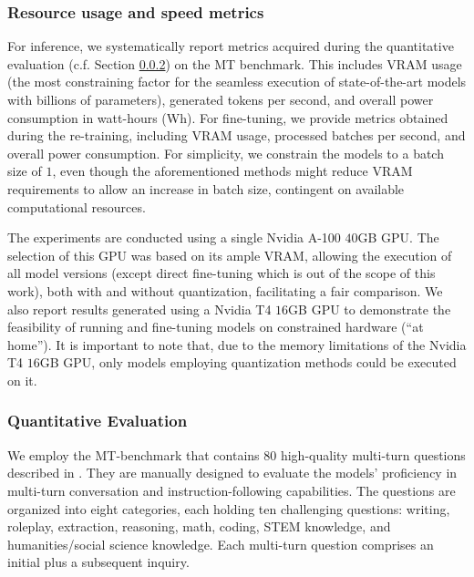 \documentclass[conference]{IEEEtran}
\begin{document}
\subsubsection{Resource usage and speed metrics}
For inference, we systematically report metrics acquired during the quantitative evaluation (c.f. Section \ref{sec:quantitative_evaluation}) on the MT benchmark. This includes VRAM usage (the most constraining factor for the seamless execution of state-of-the-art models with billions of parameters), generated tokens per second, and overall power consumption in watt-hours (Wh).
For fine-tuning, we provide metrics obtained during the re-training, including VRAM usage, processed batches per second, and overall power consumption. 
For simplicity, we constrain the models to a batch size of $1$, even though the aforementioned methods might reduce VRAM requirements to allow an increase in batch size, contingent on available computational resources.

The experiments are conducted using a single Nvidia A-100 $40$GB GPU. The selection of this GPU was based on its ample VRAM, allowing the execution of all model versions (except direct fine-tuning which is out of the scope of this work), both with and without quantization, facilitating a fair comparison. We also report results generated using a Nvidia T4 $16$GB GPU to demonstrate the feasibility of running and fine-tuning models on constrained hardware (``at home''). It is important to note that, due to the memory limitations of the Nvidia T4 $16$GB GPU, only models employing quantization methods could be executed on it.

\subsubsection{Quantitative Evaluation}\label{sec:quantitative_evaluation}
We employ the MT-benchmark that contains $80$ high-quality multi-turn questions described in \cite{zheng_judging_2023}. They are manually designed to evaluate the models' proficiency in multi-turn conversation and instruction-following capabilities. The questions are organized into eight categories, each holding ten challenging questions: writing, roleplay, extraction, reasoning, math, coding, STEM knowledge, and humanities/social science knowledge. Each multi-turn question comprises an initial plus a subsequent inquiry.
\end{document}
